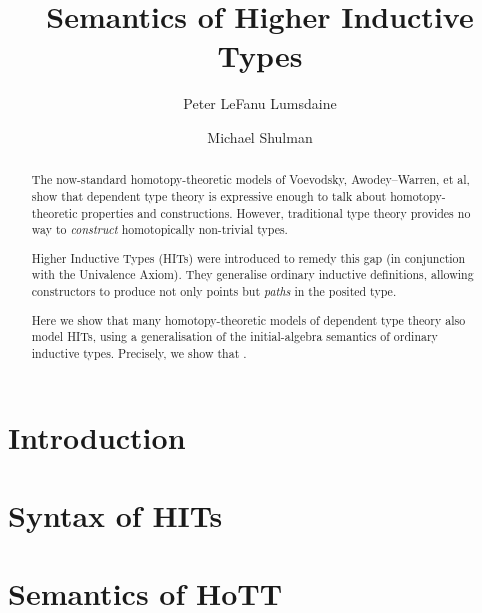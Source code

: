 \documentclass{amsart}
\title{Semantics of Higher Inductive Types}
\author{Peter LeFanu Lumsdaine}
\author{Michael Shulman}
\begin{document}
\maketitle

\begin{abstract}
The now-standard homotopy-theoretic models of Voevodsky, Awodey--Warren, et al, show that dependent type theory is expressive enough to talk about homotopy-theoretic properties and constructions.
%
However, traditional type theory provides no way to \emph{construct} homotopically non-trivial types.

Higher Inductive Types (HITs) were introduced to remedy this gap (in conjunction with the Univalence Axiom).
%
They generalise ordinary inductive definitions, allowing constructors to produce not only points but \emph{paths} in the posited type.

Here we show that many homotopy-theoretic models of dependent type theory also model HITs, using a generalisation of the initial-algebra semantics of ordinary inductive types.
%
Precisely, we show that \todo{\ldots} .
\end{abstract}


\tableofcontents

\section{Introduction}





\section{Syntax of HITs}





\section{Semantics of HoTT}
\end{document}
